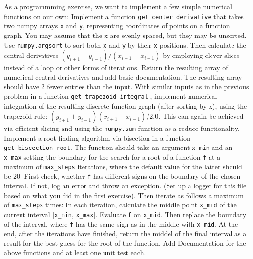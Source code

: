 \documentclass[]{erlangen-problemset}
\begin{document}
\begin{problem}[title={Rebuilding numpy and scipy functionality ourselves}]
As a programmming exercise, we want to implement a few simple numerical functions on our own:
\noindent
\Question Implement a function  \texttt{get\_center\_derivative} that takes two numpy arrays \texttt{x} and \texttt{y}, representing coordinates of points on a function graph. 
You may assume that the x are evenly spaced, but they may be unsorted.
Use  \texttt{numpy.argsort} to sort both  \texttt{x} and  \texttt{y} by their  \texttt{x}-positions.
Then calculate the central derivatives $(y_{i+1}-y_{i-1})/(x_{i+1}-x_{i-1})$ by employing clever slices instead of a loop or other forms of iterations.
Return the resulting array of numerical central derivatives and add basic documentation.
The resulting array should have 2 fewer entries than the input.
\Question With similar inputs as in the previous problem in a function \texttt{get\_trapezoid\_integral} , implement numerical integration of the resulting discrete function graph (after sorting by x), using the trapezoid rule: $(y_{i+1}+y_{i-1})(x_{i+1}-x_{i-1})/2.0$.
This can again be achieved via efficient slicing and using the \texttt{numpy.sum} function as a reduce functionality.
\Question Implement a root finding algorithm via bisection in a function \texttt{get\_biscection\_root}. 
The function should take an argument  \texttt{x\_min} and an  \texttt{x\_max} setting the boundary for the search for a root of a function \texttt{f} at a maximum of \texttt{max\_steps} iterations, where the default value for the latter should be $20$.
First check, whether  \texttt{f} has different signs on the boundary of the chosen interval.
If not, log an error and throw an exception. (Set up a logger for this file based on what you did in the first exercise).
Then iterate as follows a maximum of \texttt{max\_steps} times:
In each iteration, calculate the middle point  \texttt{x\_mid} of the current interval  [\texttt{x\_min}, \texttt{x\_max}]. 
Evaluate  \texttt{f} on \texttt{x\_mid}.
Then replace the boundary of the interval, where  \texttt{f} has the same sign as in the middle with  \texttt{x\_mid}.
At the end, after the iterations have finished, return the middel of the final interval as a result for the best guess for the root of the function.
\Question Add Documentation for the above functions and at least one unit test each.
\end{problem}
\end{document}
